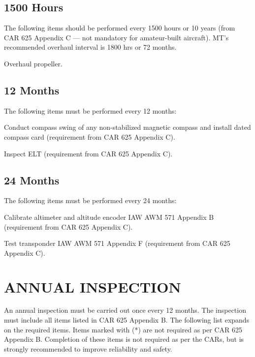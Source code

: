 \subsection{1500 Hours} The following items should be performed every 1500 hours or 10 years (from CAR 625 Appendix C --- not mandatory for amateur-built aircraft). MT's recommended overhaul interval is 1800 hrs or 72 months.
\begin{enumerate*}
	\item Overhaul propeller. 
\end{enumerate*}

\subsection{12 Months} The following items must be performed every 12 months:
\begin{enumerate*}
	\item Conduct compass swing of any non-stabilized magnetic compass and install dated compass card (requirement from CAR 625 Appendix C).
	\item Inspect ELT (requirement from CAR 625 Appendix C).
\end{enumerate*}

\subsection{24 Months} The following items must be performed every 24 months:
\begin{enumerate*}
	\item Calibrate altimeter and altitude encoder IAW AWM 571 Appendix B (requirement from CAR 625 Appendix C).
	\item Test transponder IAW AWM 571 Appendix F (requirement from CAR 625 Appendix C).
\end{enumerate*}

\section{ANNUAL INSPECTION} An annual inspection must be carried out once every 12 months.  The inspection must include all items listed in CAR 625 Appendix B.  The following list expands on the required items.  Items marked with (*) are not required as per CAR 625 Appendix B.  Completion of these items is not required as per the CARs, but is strongly recommended to improve reliability and safety.

